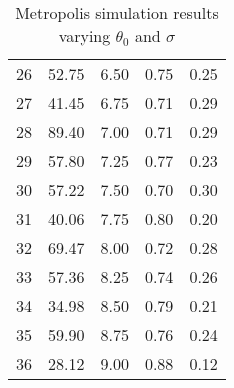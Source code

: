 \begin{center}
\begin{table}
\begin{tabular}{|ccccc|}
26 &    52.75 &     6.50 &     0.75 &     0.25 \\  
27 &    41.45 &     6.75 &     0.71 &     0.29 \\  
28 &    89.40 &     7.00 &     0.71 &     0.29 \\  
29 &    57.80 &     7.25 &     0.77 &     0.23 \\  
30 &    57.22 &     7.50 &     0.70 &     0.30 \\  
31 &    40.06 &     7.75 &     0.80 &     0.20 \\  
32 &    69.47 &     8.00 &     0.72 &     0.28 \\  
33 &    57.36 &     8.25 &     0.74 &     0.26 \\  
34 &    34.98 &     8.50 &     0.79 &     0.21 \\  
35 &    59.90 &     8.75 &     0.76 &     0.24 \\  
36 &    28.12 &     9.00 &     0.88 &     0.12 \\  
\end{tabular}
\caption{ Metropolis simulation results varying $\theta_0$ and $\sigma$ }
\end{table}
\end{center}
